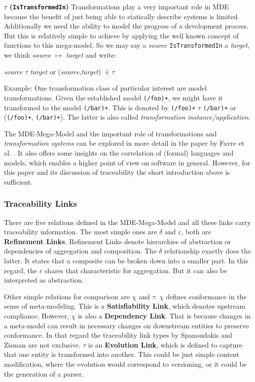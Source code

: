 \documentclass[runningheads,a4paper]{llncs}
\begin{document}
\textbf{$\tau$ (\texttt{IsTransformedIn})}
Transformations play a very important role in MDE because the benefit of just being able to statically describe systems is limited.
Additionally we need the ability to model the progress of a development process. 
But this is relatively simple to achieve by applying the well known concept of functions to this mega-model. 
So we may say a \textit{source} \texttt{IsTransformedIn} a \textit{target}, we think \textit{source} $\mapsto$ \textit{target} and write:
\begin{center} 
\textit{source} $\tau$ \textit{target}
or 
(\textit{source},\textit{target}) $\in\tau$
\end{center}
Example:
One transformation class of particular interest are model transformations. 
Given the established model \texttt{(/foo)+}, we might have it transformed to the model \texttt{(/bar)+}. 
This is denoted by \texttt{(/foo)+} $\tau$ \texttt{(/bar)+} or (\texttt{(/foo)+}, \texttt{(/bar)+}). 
The latter is also called \textit{transformation instance/application}.

The MDE-Mega-Model and the important role of transformations and \textit{transformation systems} can be explored in more detail in the paper by Favre et al. \cite{TowardsAMegamodel}. 
It also offers some insights on the correlation of (formal) languages and models, which enables a higher point of view on software in general. 
However, for this paper and its discussion of traceability the short introduction above is sufficient.

\subsubsection{Traceability Links}
There are five relations defined in the MDE-Mega-Model and all these links carry traceability information.
The most simple ones are $\delta$ and $\varepsilon$, both are \textbf{Refinement Links}.
Refinement Links denote hierarchies of abstraction or dependencies of aggregation and composition.
The $\delta$ relationship exactly does the latter. 
It states that a composite can be broken down into a smaller part.
In this regard, the $\varepsilon$ shares that characteristic for aggregation.
But it can also be interpreted as abstraction.

Other simple relations for comparison are $\chi$ and $\tau$.
$\chi$ defines conformance in the sense of meta-modeling.
This is a \textbf{Satisfiability Link}, which denotes upstream compliance.
However, $\chi$ is also a \textbf{Dependency Link}.
That is because changes in a meta-model can result in necessary changes on downstream entities to preserve conformance.
In that regard the traceability link types by Spanoudakis and Zisman are not exclusive. 
$\tau$ is an \textbf{Evolution Link}, which is defined to capture that one entity is transformed into another.
This could be just simple content modification, where the evolution would correspond to versioning, or it could be the generation of a parser.
\end{document}
